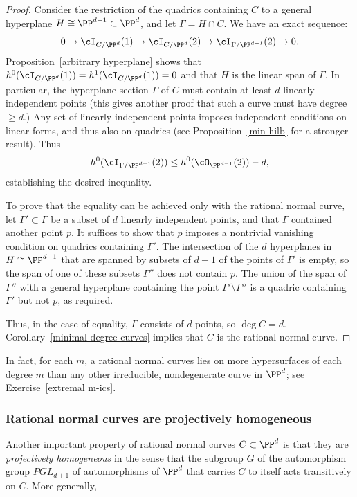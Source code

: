 \begin{proof}
Consider the restriction of the quadrics containing $C$ to a general hyperplane $H \cong \PP^{d-1} \subset \PP^d$, and let $\Gamma = H \cap C$. We have an exact sequence:
$$
0 \to \cI_{C/\PP^d}(1) \to \cI_{C/\PP^d}(2) \to \cI_{\Gamma/\PP^{d-1}}(2) \to 0.
$$ 
Proposition~\ref{arbitrary hyperplane} shows that $h^0(\cI_{C/\PP^d}(1)) = h^1(\cI_{C/\PP^d}(1))=0$ and that $H$ is the linear span of  $\Gamma$. In particular, the hyperplane section $\Gamma$ of $C$ must contain at least $d$ linearly independent points (this gives another proof that
such a curve must have degree $\geq d$.)
Any set of linearly independent points imposes independent conditions on linear forms, and thus also on quadrics (see 
Proposition~\ref{min hilb} for a stronger result). Thus
$$
h^0(\cI_{\Gamma/\PP^{d-1}}(2)) \leq h^0(\cO_{\PP^{d-1}}(2)) - d,
$$
establishing the desired inequality. 

To prove that the equality can be achieved only with the rational normal curve, let $\Gamma'\subset \Gamma$ be a subset
of $d$ linearly independent points, and that $\Gamma$ contained another point $p$.
It suffices to show that $p$ imposes a nontrivial vanishing condition on quadrics containing $\Gamma'$.
The intersection of the $d$ hyperplanes in $H \cong \PP^{d-1}$ that are spanned by subsets of $d-1$ of the
points of $\Gamma'$ is empty, so the span of one of these subsets $\Gamma''$ does not contain $p$. The union of 
the span of $\Gamma''$ with a general hyperplane containing the point $\Gamma' \setminus \Gamma''$
is a quadric containing $\Gamma'$ but not $p$, as required. 

Thus, in the case of equality, $\Gamma$ consists of $d$ points, so $\deg C = d$.
Corollary~\ref{minimal degree curves} implies that $C$ is the rational normal curve.
\end{proof}

In fact, for each $m$, a rational normal curves lies on more hypersurfaces of each degree $m$ than any other irreducible, nondegenerate curve in $\PP^d$; see Exercise~\ref{extremal m-ics}. 

\subsubsection{Rational normal curves are projectively homogeneous}

Another important property of rational normal curves $C \subset \PP^d$ is that they are \emph{projectively homogeneous} in the sense that the subgroup $G$ of the automorphism group $PGL_{d+1}$ of automorphisms of $\PP^d$ that carries $C$ to itself acts transitively on $C$. More generally,

